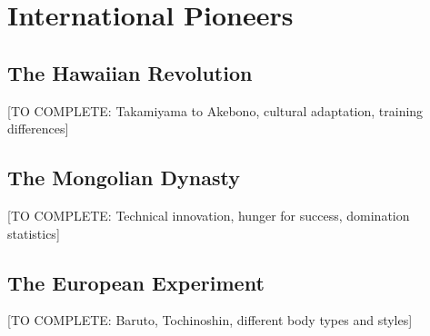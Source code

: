 \section{International Pioneers}

\subsection{The Hawaiian Revolution}

[TO COMPLETE: Takamiyama to Akebono, cultural adaptation, training differences]

\subsection{The Mongolian Dynasty}

[TO COMPLETE: Technical innovation, hunger for success, domination statistics]

\subsection{The European Experiment}

[TO COMPLETE: Baruto, Tochinoshin, different body types and styles]